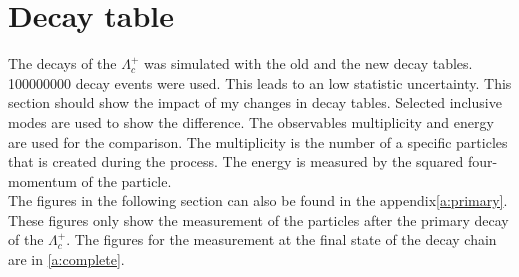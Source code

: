 \section{Decay table}
The decays of the \(\Lambda_c^+\) was simulated with the old and the new 
decay tables. 100000000  decay events were used. This leads to an low 
statistic uncertainty. This section should show the impact of my changes in 
decay tables. Selected inclusive modes are used to show the difference. The 
observables multiplicity and energy are used for the comparison. The multiplicity 
is the number of a specific particles that is created during the process. The 
energy is measured by the squared four-momentum of the particle.\\
The figures in the following section can also be found in the appendix{\ref{a:primary}}.
These figures only show the measurement of the particles after the primary 
decay of the \(\Lambda_c^+\). The figures for the measurement at the final state 
of the decay chain are in {\ref{a:complete}}.

